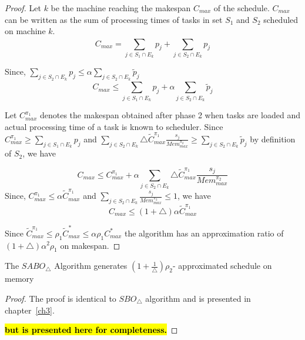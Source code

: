 \documentclass[twocolumn]{svjour3}
\newcommand{\todo}[1]{{\color{red}\textbf{\hl{#1}}\xspace}}
\begin{document}
\begin{proof}
  Let $k$ be the machine reaching the makespan $C_{max}$ of the
  schedule. $C_{max}$ can be written as the sum of processing times of
  tasks in set $S_1$ and $S_2$ scheduled on machine $k$.
  \begin{equation}\nonumber
    C_{max}= \sum_{j \in S_1 \cap E_k}^{}p_j+\sum_{j \in S_2 \cap E_k}^{}p_j 
  \end{equation}
  
  Since, $\sum\limits
  _{j \in S_2 \cap E_k}^{}p_j\leq\alpha\sum\limits
  _{j \in S_2 \cap E_k} \tilde{p}_j$
  \begin{equation}\nonumber
    C_{max} \leq \sum_{j \in S_1 \cap E_k}^{}p_j+\alpha\sum_{j \in S_2 \cap E_k} \tilde{p}_j 
  \end{equation}
  
  
  Let $C^{\pi_1}_{max}$ denotes the makespan obtained after phase 2
  when tasks are loaded and actual processing time of a task is known
  to scheduler. Since $C^{\pi_1}_{max} \geq \sum\limits _{j \in S_1
    \cap E_k}^{}p_j$ and $\sum\limits _{j \in S_2\cap E_k}\triangle
  {\tilde{C}^{\pi_1}_{max}} \frac{s_j}{Mem^{\pi_2}_{max}}\geq
  \sum\limits _{j \in S_2\cap E_k}^{}\tilde{p}_j $ by definition of
  $S_2$, we have
          
  \begin{equation}\nonumber
    C_{max}\leq C^{\pi_1}_{max}+\alpha\sum_{j \in S_2\cap E_k}^{}\triangle {\tilde{C}^{\pi_1}_{max}} \frac{s_j}{Mem^{\pi_2}_{max}}
  \end{equation}                    
  Since, $C^{\pi_1}_{max}\leq\alpha\tilde{C}^{\pi_1}_{max}$ and
  $\sum\limits_{j \in S_2\cap E_k} \frac{s_j}{Mem^{\pi_2}_{max}}\leq 1$,
  we have
  \begin{equation}
    \nonumber C_{max}\leq(1+\triangle)\alpha\tilde{C}^{\pi_1}_{max}
  \end{equation}
  
  Since $ \tilde{C}^{\pi_1}_{max} \leq \rho_1 \tilde{C}^{*}_{max}\leq
  \alpha\rho_1 {C}^{*}_{max}$ the algorithm has an approximation ratio
  of $(1+\triangle)\alpha^2 \rho_1$ on makespan.
\end{proof}
\begin{theorem} \label{th:chapter5-2b} The $SABO_\triangle$ Algorithm
  generates $ (1+\frac{1}{\triangle})\rho_2 $- approximated schedule
  on memory
\end{theorem}                      

\begin{proof}  
  The proof is identical to $SBO_\triangle$ algorithm and is presented
  in chapter~\ref{ch3}.

  \todo{but is presented here for completeness.}
\end{proof}    
    
\end{document}
